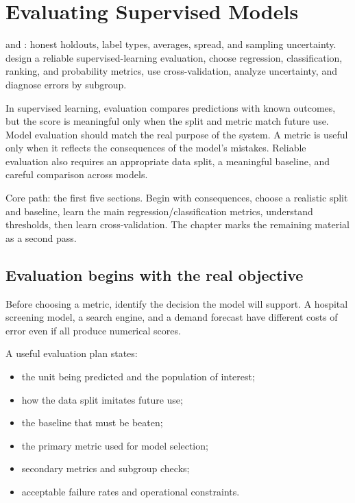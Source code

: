 \chapter{Evaluating Supervised Models}
\label{ch:evaluation}

\chapterguide%
  { and : honest holdouts, label types, averages, spread, and sampling uncertainty.}
  {design a reliable supervised-learning evaluation, choose regression, classification, ranking, and probability metrics, use cross-validation, analyze uncertainty, and diagnose errors by subgroup.}

In supervised learning, evaluation compares predictions with known outcomes, but the score is meaningful only when the split and metric match future use. Model evaluation should match the real purpose of the system. A metric is useful only when it reflects the consequences of the model's mistakes. Reliable evaluation also requires an appropriate data split, a meaningful baseline, and careful comparison across models.

\begin{firstread}
Core path: the first five sections. Begin with consequences, choose a realistic split and baseline, learn the main regression/classification metrics, understand thresholds, then learn cross-validation. The chapter marks the remaining material as a second pass.
\end{firstread}

\section{Evaluation begins with the real objective}

Before choosing a metric, identify the decision the model will support. A hospital screening model, a search engine, and a demand forecast have different costs of error even if all produce numerical scores.

A useful evaluation plan states:

\begin{itemize}
  \item the unit being predicted and the population of interest;
  \item how the data split imitates future use;
  \item the baseline that must be beaten;
  \item the primary metric used for model selection;
  \item secondary metrics and subgroup checks;
  \item acceptable failure rates and operational constraints.
\end{itemize}


